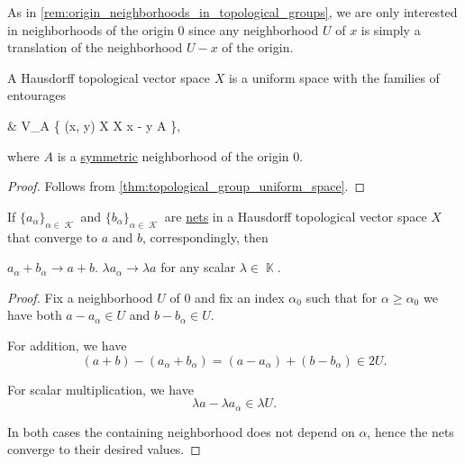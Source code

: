 \begin{remark}\label{rem:origin_neighborhoods_in_topological_vector_spaces}
  As in \cref{rem:origin_neighborhoods_in_topological_groups}, we are only interested in neighborhoods of the origin \( 0 \) since any neighborhood \( U \) of \( x \) is simply a translation of the neighborhood \( U - x \) of the origin.
\end{remark}

\begin{proposition}\label{thm:topological_vector_space_is_uniform}
  A Hausdorff topological vector space \( X \) is a uniform space with the families of entourages
  \begin{balign*}
     & V_A \coloneqq \{ (x, y) \in X \times X \colon x - y \in A \},
  \end{balign*}
  where \( A \) is a \hyperref[def:neighborhood_set_types/symmetric]{symmetric} neighborhood of the origin \( 0 \).
\end{proposition}
\begin{proof}
  Follows from \cref{thm:topological_group_uniform_space}.
\end{proof}

\begin{proposition}\label{thm:linearity_of_sequence_limits}
  If \( \{ a_\alpha \}_{\alpha \in \mscrK} \) and \( \{ b_\alpha \}_{\alpha \in \mscrK} \) are \hyperref[def:topological_net]{nets} in a Hausdorff topological vector space \( X \) that converge to \( a \) and \( b \), correspondingly, then
  \begin{thmenum}
     \( a_\alpha + b_\alpha \to a + b \).
     \( \lambda a_\alpha \to \lambda a \) for any scalar \( \lambda \in \BbbK \).
  \end{thmenum}
\end{proposition}
\begin{proof}
  Fix a neighborhood \( U \) of \( 0 \) and fix an index \( \alpha_0 \) such that for \( \alpha \geq \alpha_0 \) we have both \( a - a_\alpha \in U \) and \( b - b_\alpha \in U \).

   For addition, we have
  \begin{equation*}
    (a + b) - (a_\alpha + b_\alpha) = (a - a_\alpha) + (b - b_\alpha) \in 2U.
  \end{equation*}

   For scalar multiplication, we have
  \begin{equation*}
    \lambda a - \lambda a_\alpha \in \lambda U.
  \end{equation*}

  In both cases the containing neighborhood does not depend on \( \alpha \), hence the nets converge to their desired values.
\end{proof}

